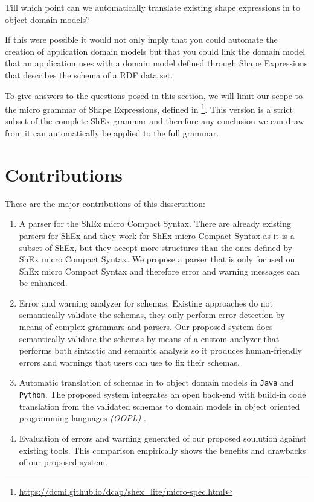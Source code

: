 \begin{researchquestion}
  Till which point can we automatically translate existing shape expressions in to object domain models?
\end{researchquestion}

If this were possible it would not only imply that you could automate the creation of application domain models but that you could link the domain model that an
application uses with a domain model defined through Shape Expressions that describes the schema of a RDF data set.

\bigskip

To give answers to the questions posed in this section, we will limit our scope to the micro grammar of Shape Expressions, defined in
\footnote{\url{https://dcmi.github.io/dcap/shex_lite/micro-spec.html}}. This version is a strict subset of the complete ShEx grammar
and therefore any conclusion we can draw from it can automatically be applied to the full grammar.


\section{Contributions}
\label{sec:intro-contri}
These are the major contributions of this dissertation:

\begin{enumerate}
  \item A parser for the ShEx micro Compact Syntax. There are already existing parsers for ShEx and they work for ShEx micro Compact Syntax
  as it is a subset of ShEx, but they accept more structures than the ones defined by ShEx micro Compact Syntax. We propose a parser that
  is only focused on ShEx micro Compact Syntax and therefore error and warning messages can be enhanced.
  
  \item Error and warning analyzer for schemas. Existing approaches do not semantically validate the schemas, they
  only perform error detection by means of complex grammars and parsers. Our proposed system does semantically validate the schemas by means
  of a custom analyzer that performs both sintactic and semantic analysis so it produces human-friendly errors and warnings that users can
  use to fix their schemas.

  \item Automatic translation of schemas in to object domain models in \texttt{Java} and \texttt{Python}. The proposed system
  integrates an open back-end with build-in code translation from the validated schemas to domain models in object
  oriented programming languages \textit{(OOPL)} \cite{oopl}.

  \item Evaluation of errors and warning generated of our proposed soulution against existing tools. This comparison
  empirically shows the benefits and drawbacks of our proposed system.
\end{enumerate}

